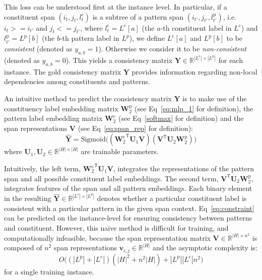 \documentclass[11pt]{article}
\begin{document}
This loss can be understood first at the instance level.
In particular, if a constituent span $(i_t,j_t,l^{\mathrm{c}}_t)$ is a subtree of a pattern span $(i_{t'}, j_{t'}, l^{\mathrm{p}}_{t'})$, i.e. $i_t >= i_{t'} $ and $j_t <= j_{t'}$, 
where $l^{\mathrm{c}}_t=L^{\mathrm{c}}[a]$ (the $a$-th constituent label in $L^{\mathrm{c}}$) and $l^{\mathrm{p}}_{t'}=L^{\mathrm{p}}[b]$ (the $b$-th pattern label in $L^p$),
we define $L^{\mathrm{c}}[a]$ and $L^{\mathrm{p}}[b]$ to be {\it consistent} (denoted as $y_{a,b}=1$). 
Otherwise we consider it to be {\it non-consistent} (denoted as $y_{a,b}=0$). 
This yields a consistency matrix $\mathbf{Y} \in \mathbb{R}^{|L^\mathrm{c}| \times |L^{\mathrm{p}}|}$ for each instance. 
The gold consistency matrix $\mathbf{Y}$ provides information regarding non-local dependencies among constituents and patterns. 







An intuitive method to predict the consistency matrix $\mathbf{Y}$ is to make use of the constituency label embedding matrix ${\mathbf{W}^{\mathrm{p}}_2}$ (see Eq~\ref{eq:mlp_1} for definition), the pattern label embedding matrix $\mathbf{W}^{\mathrm{c}}_2$ (see Eq~\ref{softmax} for definition) and the span representations $\mathbf{V}$ (see Eq~\ref{eq:span_rep} for definition): 
\begin{equation}
    \hat{\mathbf{Y}} = \mathrm{Sigmoid}\big(({\mathbf{W}^{\mathrm{c}}_2}^\mathsf{T} \mathbf{U}_1 \mathbf{V}) (\mathbf{V}^\mathsf{T} \mathbf{U}_2 {\mathbf{W}^{\mathrm{p}}_2})\big)
\label{eq:constraint}
\end{equation}
where $\mathbf{U}_1, \mathbf{U}_2 \in \mathbb{R}^{|H| \times |H|}$ are trainable parameters.


Intuitively, the left term, ${\mathbf{W}^{\mathrm{c}}_2}^\mathsf{T} \mathbf{U}_1 \mathbf{V}$, integrates the representations of the pattern span and all possible constituent label embeddings. The second term, $\mathbf{V}^\mathsf{T} \mathbf{U}_2 {\mathbf{W}^{\mathrm{p}}_2}$, integrates features of the span and all pattern embeddings. Each binary element in the resulting $\hat{\mathbf{Y}} \in \mathbb{R}^{|L^c|\times|L^p|}$ denotes whether a particular constituent label is consistent with a particular pattern in the given span context.
Eq~\ref{eq:constraint} can be predicted on the instance-level for ensuring consistency between patterns and constituent.
However, this naive method is difficult for training, and computationally infeasible, because the span representation matrix $\mathbf{V} \in \mathbb{R}^{|H| \times n^2}$ is composed of $n^2$ span representations $\mathbf{v}_{i,j} \in \mathbb{R}^{|H|}$ and the asymptotic complexity is:
\begin{equation}
    O\Big((|L^{\mathrm{p}}| + |L^\mathrm{c}|) (|H|^2 + n^2 |H|) + |L^{\mathrm{p}}||L^\mathrm{c}|n^2\Big)
\end{equation}
for a single training instance. 
\end{document}
